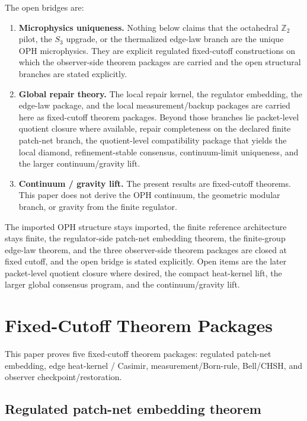 \documentclass[11pt]{article}
\begin{document}
The open bridges are:
\begin{enumerate}[leftmargin=2em]
\item \textbf{Microphysics uniqueness.}
Nothing below claims that the octahedral $\mathbb Z_2$ pilot, the $S_3$ upgrade, or the
thermalized edge-law branch are the unique OPH microphysics. They are explicit regulated
fixed-cutoff constructions on which the observer-side theorem packages are carried and
the open structural branches are stated explicitly.
\item \textbf{Global repair theory.}
The local repair kernel, the regulator embedding, the edge-law package, and the local
measurement/backup packages are carried here as fixed-cutoff theorem packages. Beyond those
branches lie packet-level quotient closure where available,
repair completeness on the declared finite patch-net branch, the quotient-level compatibility
package that yields the local diamond, refinement-stable consensus, continuum-limit uniqueness,
and the larger continuum/gravity lift.
\item \textbf{Continuum / gravity lift.}
The present results are fixed-cutoff theorems. This paper does not derive the OPH
continuum, the geometric modular branch, or gravity from the finite regulator.
\end{enumerate}

The imported OPH structure stays imported, the finite reference architecture stays finite, the
regulator-side patch-net embedding theorem, the finite-group edge-law theorem, and the three
observer-side theorem packages are closed at fixed cutoff, and the open bridge is stated
explicitly. Open items are the later packet-level quotient closure where desired, the
compact heat-kernel lift, the larger global consensus program, and the continuum/gravity lift.

\section{Fixed-Cutoff Theorem Packages}

This paper proves five fixed-cutoff theorem packages: regulated patch-net embedding, edge heat-kernel / Casimir, measurement/Born-rule, Bell/CHSH, and observer checkpoint/restoration.

\subsection{Regulated patch-net embedding theorem}\label{sec:microphysics-feeds-a01}
\end{document}
